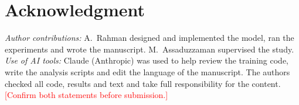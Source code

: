 \documentclass[journal,onecolumn]{IEEEtran}
\newcommand{\todo}[1]{\textcolor{red}{[#1]}}
\begin{document}
\section*{Acknowledgment}
\textit{Author contributions:} A.~Rahman designed and implemented the model, ran the experiments and wrote the manuscript. M.~Assaduzzaman supervised the study. \textit{Use of AI tools:} Claude (Anthropic) was used to help review the training code, write the analysis scripts and edit the language of the manuscript. The authors checked all code, results and text and take full responsibility for the content. \todo{Confirm both statements before submission.}



\end{document}
